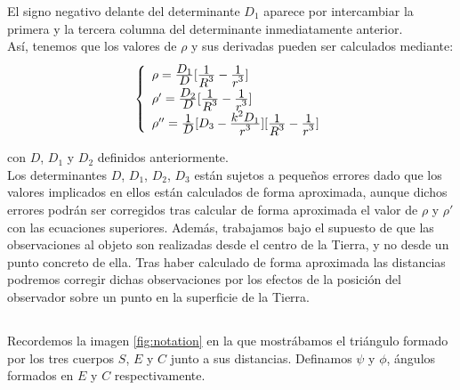 \documentclass[11pt]{article}
\newcommand\ddfrac[2]{\frac{\displaystyle #1}{\displaystyle #2}}
\begin{document}
El signo negativo delante del determinante $D_1$ aparece por intercambiar la primera y la tercera columna del determinante inmediatamente anterior.\\

Así, tenemos que los valores de $\rho$ y sus derivadas pueden ser calculados mediante:
\begin{align}
\left\{
\def\arraystretch{1.5}
\begin{array}{l}
	\rho   = \ddfrac{D_1}{D}[\ddfrac{1}{R^3}-\ddfrac{1}{r^3}]\\
	\rho'  = \ddfrac{D_2}{D}[\ddfrac{1}{R^3}-\ddfrac{1}{r^3}]\\
	\rho'' = \ddfrac{1}{D}[D_3-\ddfrac{k^2D_1}{r^3}][\ddfrac{1}{R^3}-\ddfrac{1}{r^3}]
\end{array}
\right.
\label{eq:rho_values}
\end{align}

\noindent con $D$, $D_1$ y $D_2$ definidos anteriormente.\\

Los determinantes $D$, $D_1$, $D_2$, $D_3$ están sujetos a pequeños errores dado que los valores implicados en ellos están calculados de forma aproximada, aunque dichos errores podrán ser corregidos tras calcular de forma aproximada el valor de $\rho$ y $\rho'$ con las ecuaciones superiores. Además, trabajamos bajo el supuesto de que las observaciones al objeto son realizadas desde el centro de la Tierra, y no desde un punto concreto de ella. Tras haber calculado de forma aproximada las distancias podremos corregir dichas observaciones por los efectos de la posición del observador sobre un punto en la superficie de la Tierra.\\


\subsection{}
\label{subsec:distancias_r_rho}
Recordemos la imagen \ref{fig:notation} en la que mostrábamos el triángulo formado por los tres cuerpos $S$, $E$ y $C$ junto a sus distancias. Definamos $\psi$ y $\phi$, ángulos formados en $E$ y $C$ respectivamente.
\end{document}
